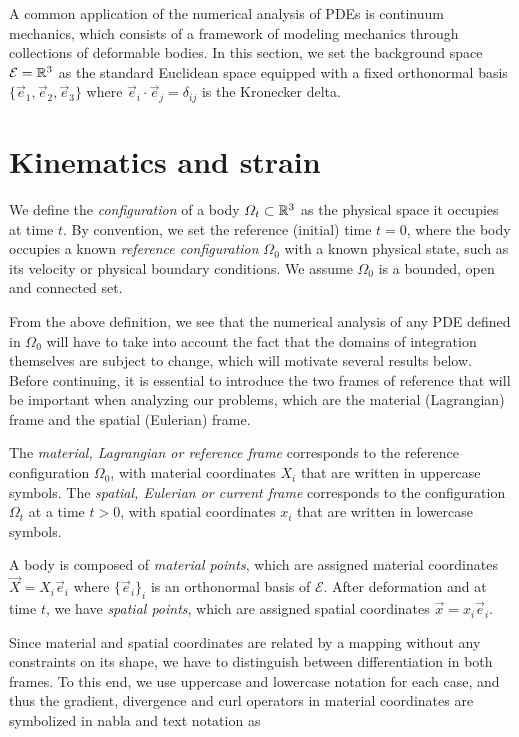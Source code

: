 A common application of the numerical analysis of PDEs is continuum mechanics, which consists of a framework of modeling mechanics through collections of deformable bodies. In this section, we set the background space $\mathcal{E} = \mathbb{R}^3$ as the standard Euclidean space equipped with a fixed orthonormal basis $\{\vec e_1, \vec e_2, \vec e_3\}$ where $\vec e_i\cdot\vec e_j = \delta_{ij}$ is the Kronecker delta.
\section{Kinematics and strain}\label{sec:kinematics-strain}
\begin{definition}[Configuration]\label{def:configuration}
    We define the \emph{configuration} of a body $\Omega_t\subset \mathbb{R}^3$ as the physical space it occupies at time $t$. By convention, we set the reference (initial) time $t=0$, where the body occupies a known \emph{reference configuration} $\Omega_0$ with a known physical state, such as its velocity or physical boundary conditions. We assume $\Omega_0$ is a bounded, open and connected set.
\end{definition}
From the above definition, we see that the numerical analysis of any PDE defined in $\Omega_0$ will have to take into account the fact that the domains of integration themselves are subject to change, which will motivate several results below. Before continuing, it is essential to introduce the two frames of reference that will be important when analyzing our problems, which are the material (Lagrangian) frame and the spatial (Eulerian) frame. 
\begin{definition}\label{def:frames}
    The \emph{material, Lagrangian or reference frame} corresponds to the reference configuration $\Omega_0$, with material coordinates $X_i$ that are written in uppercase symbols. The \emph{spatial, Eulerian or current frame} corresponds to the configuration $\Omega_t$ at a time $t>0$, with spatial coordinates $x_i$ that are written in lowercase symbols. 

    A body is composed of \emph{material points}, which are assigned material coordinates $\vec X=X_i\vec e_i$ where $\{\vec e_i\}_i$ is an orthonormal basis of $\mathcal{E}$. After deformation and at time $t$, we have \emph{spatial points}, which are assigned spatial coordinates $\vec x = x_i\vec e_i$.
\end{definition}
Since material and spatial coordinates are related by a mapping without any constraints on its shape, we have to distinguish between differentiation in both frames. To this end, we use uppercase and lowercase notation for each case, and thus the gradient, divergence and curl operators in material coordinates are symbolized in nabla and text notation as 
